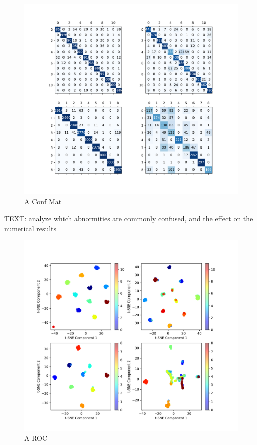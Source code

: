\documentclass{article}
\begin{document}
	\begin{figure}[htbp]
		\centering
		\includegraphics[width=0.8\linewidth]{Figs/abnormity_confusion_matrix.pdf}
		\caption{A Conf Mat}
		\vspace{0.3cm}
		\label{fig:A_conf_mat}
	\end{figure}
	
	TEXT: analyze which abnormities are commonly confused, and the effect on the numerical results
	
	\begin{figure}[htbp]
		\centering
		\includegraphics[width=\linewidth]{Figs/abnormity_tSNE.pdf}
		\caption{A ROC}
		\vspace{0.3cm}
		\label{fig:A_tSNE}
	\end{figure}
	
\end{document}
